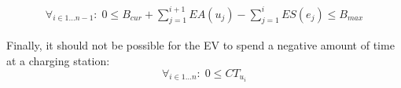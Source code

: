 \begin{equation*}
\begin{aligned}
\forall_{i\in1 \dots n-1}:\;0 \leq B_{cur} + \sum_{j=1}^{i+1} EA(u_j) - \sum_{j=1}^{i} ES(e_j) \leq B_{max}
\end{aligned}
\end{equation*}

Finally, it should not be possible for the EV to spend a negative amount of time at a charging station:
\begin{equation*}
\forall_{i\in1 \dots n }:\; 0 \leq CT_{u_i}
\end{equation*}
